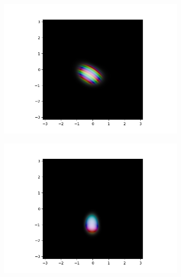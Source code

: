 \documentclass{article}
\begin{document}
\begin{appendices}
\begin{figure}[h]
\begin{subfigure}[b]{0.5 \textwidth}
  \end{subfigure}
  \hfill
  \begin{subfigure}[b]{0.5 \textwidth}
    \includegraphics[width = \textwidth]{graphics/torsional/wavefunction_contour_block_0_level_0_timestep_0000200.PNG}
  \end{subfigure}
  \hfill
  \begin{subfigure}[b]{0.5 \textwidth}
    \includegraphics[width = \textwidth]{graphics/torsional/wavefunction_contour_block_0_level_0_timestep_0000300.PNG}
  \end{subfigure}
  \hfill
  \begin{subfigure}[b]{0.5 \textwidth}

\end{subfigure}
\end{figure}
\end{appendices}
\end{document}
